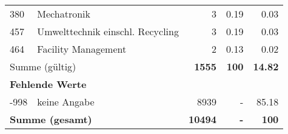 \begin{longtable}{lXrrr}
        380 & \multicolumn{1}{X}{Mechatronik} & %
          \num{3} &
          \num[round-mode=places,round-precision=2]{0,19} &
          \num[round-mode=places,round-precision=2]{0,03} \\

        457 & \multicolumn{1}{X}{Umwelttechnik einschl. Recycling} & %
          \num{3} &
          \num[round-mode=places,round-precision=2]{0,19} &
          \num[round-mode=places,round-precision=2]{0,03} \\

        464 & \multicolumn{1}{X}{Facility Management} & %
          \num{2} &
          \num[round-mode=places,round-precision=2]{0,13} &
          \num[round-mode=places,round-precision=2]{0,02} \\

     \midrule
     \multicolumn{2}{l}{Summe (gültig)} &
       \textbf{\num{1555}} &
     \textbf{100} &
       \textbf{\num[round-mode=places,round-precision=2]{14,82}} \\
     \multicolumn{5}{l}{\textbf{Fehlende Werte}}\\
       -998 &
       keine Angabe &
         \num{8939} &
        - &
         \num[round-mode=places,round-precision=2]{85,18} \\
     \midrule
     \multicolumn{2}{l}{\textbf{Summe (gesamt)}} &
          \textbf{\num{10494}} &
        \textbf{-} &
        \textbf{100} \\
     \bottomrule
     \end{longtable}
     

